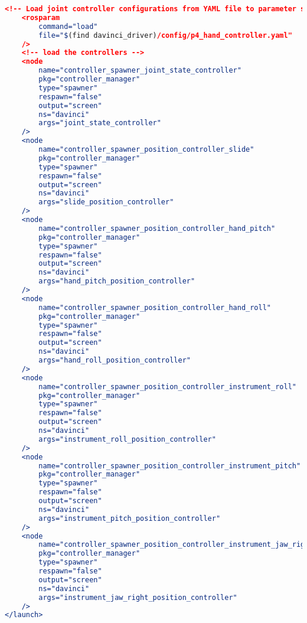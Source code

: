 \begin{lstlisting}[language=cmake]
    <!-- Load joint controller configurations from YAML file to parameter server -->
    <rosparam
        command="load"
        file="$(find davinci_driver)/config/p4_hand_controller.yaml"
    />
    <!-- load the controllers -->
    <node
        name="controller_spawner_joint_state_controller"
        pkg="controller_manager"
        type="spawner"
        respawn="false"
        output="screen"
        ns="davinci"
        args="joint_state_controller"
    />
    <node
        name="controller_spawner_position_controller_slide"
        pkg="controller_manager"
        type="spawner"
        respawn="false"
        output="screen"
        ns="davinci"
        args="slide_position_controller"
    />
    <node
        name="controller_spawner_position_controller_hand_pitch"
        pkg="controller_manager"
        type="spawner"
        respawn="false"
        output="screen"
        ns="davinci"
        args="hand_pitch_position_controller"
    />
    <node
        name="controller_spawner_position_controller_hand_roll"
        pkg="controller_manager"
        type="spawner"
        respawn="false"
        output="screen"
        ns="davinci"
        args="hand_roll_position_controller"
    />
    <node
        name="controller_spawner_position_controller_instrument_roll"
        pkg="controller_manager"
        type="spawner"
        respawn="false"
        output="screen"
        ns="davinci"
        args="instrument_roll_position_controller"
    />
    <node
        name="controller_spawner_position_controller_instrument_pitch"
        pkg="controller_manager"
        type="spawner"
        respawn="false"
        output="screen"
        ns="davinci"
        args="instrument_pitch_position_controller"
    />
    <node
        name="controller_spawner_position_controller_instrument_jaw_right"
        pkg="controller_manager"
        type="spawner"
        respawn="false"
        output="screen"
        ns="davinci"
        args="instrument_jaw_right_position_controller"
    />
</launch>
\end{lstlisting}
